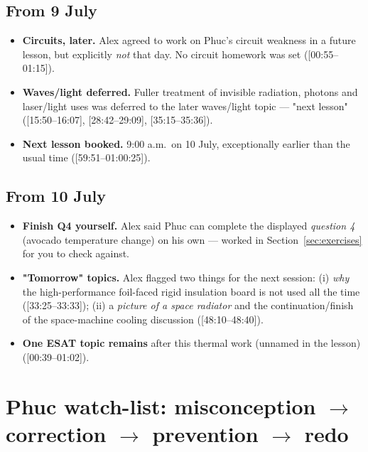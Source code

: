 \documentclass[11pt,a4paper]{article}
\newcommand{\ts}[1]{\textup{[#1]}}       %
\begin{document}
\subsection{From 9 July}
\begin{itemize}[leftmargin=1.4em,itemsep=2pt]
  \item \textbf{Circuits, later.} Alex agreed to work on Phuc's circuit weakness in a future
        lesson, but explicitly \emph{not} that day. No circuit homework was set
        (\ts{00:55--01:15}).
  \item \textbf{Waves/light deferred.} Fuller treatment of invisible radiation, photons and
        laser/light uses was deferred to the later waves/light topic --- "next lesson"
        (\ts{15:50--16:07}, \ts{28:42--29:09}, \ts{35:15--35:36}).
  \item \textbf{Next lesson booked.} 9:00 a.m.\ on 10 July, exceptionally earlier than the
        usual time (\ts{59:51--01:00:25}).
\end{itemize}

\subsection{From 10 July}
\begin{itemize}[leftmargin=1.4em,itemsep=2pt]
  \item \textbf{Finish Q4 yourself.} Alex said Phuc can complete the displayed
        \emph{question 4} (avocado temperature change) on his own --- worked in
        Section~\ref{sec:exercises} for you to check against.
  \item \textbf{"Tomorrow" topics.} Alex flagged two things for the next session:
        (i) \emph{why} the high-performance foil-faced rigid insulation board is not used
        all the time (\ts{33:25--33:33}); (ii) a \emph{picture of a space radiator} and the
        continuation/finish of the space-machine cooling discussion (\ts{48:10--48:40}).
  \item \textbf{One ESAT topic remains} after this thermal work (unnamed in the lesson)
        (\ts{00:39--01:02}).
\end{itemize}

\clearpage
\section{Phuc watch-list: misconception \texorpdfstring{$\to$}{->} correction \texorpdfstring{$\to$}{->} prevention \texorpdfstring{$\to$}{->} redo}
\end{document}
